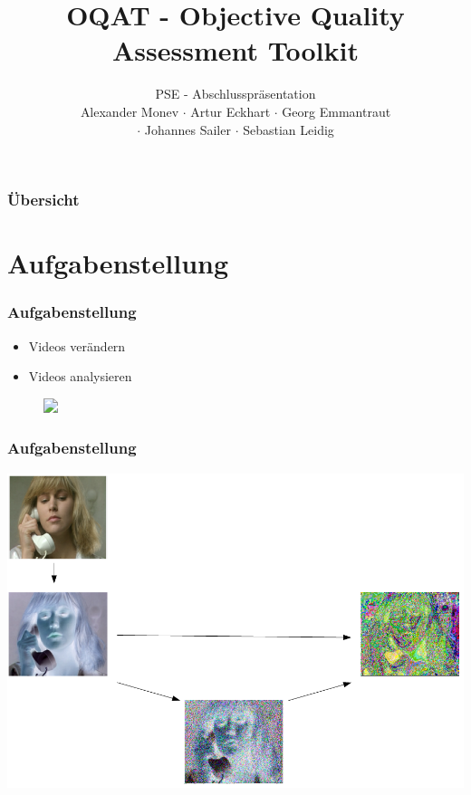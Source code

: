 \documentclass[t]{beamer}
\title{OQAT - Objective Quality Assessment Toolkit}
\subtitle{PSE - Abschlusspräsentation \\[0.3cm]
Alexander Monev $\cdot$ Artur Eckhart $\cdot$ Georg Emmantraut\\ $\cdot$ Johannes Sailer  $\cdot$ Sebastian
Leidig}
\institute[ITEC]{Institut für Technische Informatik}
\begin{document}
\begin{frame}
	\maketitle
\end{frame}

\begin{frame}
	\frametitle{Übersicht}
	\tableofcontents
\end{frame}

\section{Aufgabenstellung}

\begin{frame}
	\frametitle{Aufgabenstellung}
	
		
			\begin{itemize}
				\item <+-> Videos verändern
				\item <+-> Videos analysieren
			\end{itemize}
			\begin{figure}
				\includegraphics<4->[scale=.45]{img/aufgabe.png}
			\end{figure}
		
				

\end{frame}
\begin{frame}
	\frametitle{Aufgabenstellung}
	\begin{center}
		\vspace*{\fill}
		\includegraphics[scale=.35]{img/aufgabe2.png}
		\vspace*{\fill} ~\\
	\end{center}
\end{frame}
\end{document}
